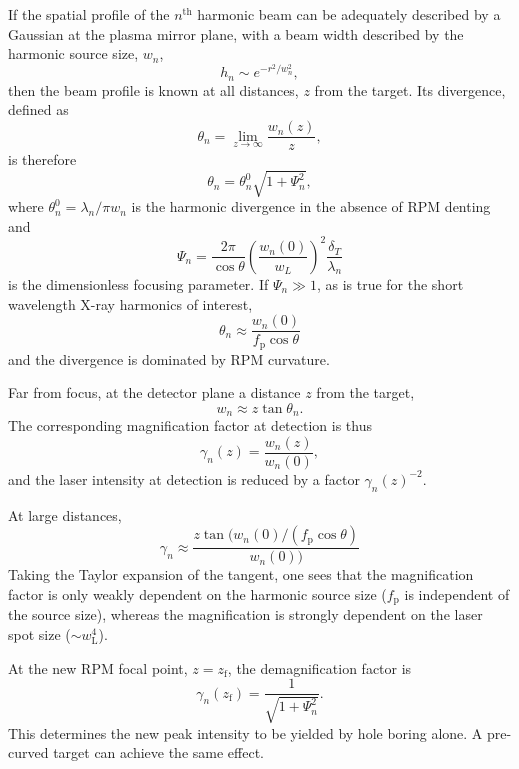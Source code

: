 If the spatial profile of the $n^\mathrm{th}$ harmonic beam can be adequately described by a Gaussian at the plasma mirror plane, with a beam width described by the harmonic source size, $w_n$,
\begin{equation}
	h_n \sim e^{-r^2/w_n^2},
\end{equation}
then the beam profile is known at all distances, $z$ from the target. Its divergence, defined as 
\begin{equation}
	\theta_n = \lim_{z\to\infty} \frac{w_n(z)}{z},
\end{equation}
is therefore
\begin{equation}
	\theta_n = \theta^0_n\sqrt{1+\Psi^2_n},
\end{equation}
where $\theta^0_n = \lambda_n/\pi w_n$ is the harmonic divergence in the absence of RPM denting and
\begin{equation}
	\Psi_n = \frac{2\pi}{\cos\theta}\left(\frac{w_n(0)}{w_L}\right)^2\frac{\delta_T}{\lambda_n}
\end{equation}
is the dimensionless focusing parameter. If $\Psi_n \gg 1$, as is true for the short wavelength X-ray harmonics of interest, 
\begin{equation}
	\theta_n \approx \frac{w_n(0)}{f_\mathrm{p}\cos\theta}
\end{equation}
and the divergence is dominated by RPM curvature. 

Far from focus, at the detector plane a distance $z$ from the target,
\begin{equation}
	w_{n} \approx z\tan\theta_n.
\end{equation}
The corresponding magnification factor at detection is thus 
\begin{equation}
	\gamma_n(z) = \frac{w_n(z)}{w_n(0)},
\end{equation}
and the laser intensity at detection is reduced by a factor $\gamma_n(z)^{-2}$.

At large distances,
\begin{equation}
	\gamma_n \approx \frac{z\tan(w_n(0)/(f_\mathrm{p}\cos\theta)}{w_n(0))}
\end{equation}
Taking the Taylor expansion of the tangent, one sees that the magnification factor is only weakly dependent on the harmonic source size ($f_\mathrm{p}$ is independent of the source size), whereas the magnification is strongly dependent on the laser spot size ($\sim w_\mathrm{L}^4$).

At the new \ac{RPM} focal point, $z = z_\mathrm{f}$, the demagnification factor is \cite{vincentiOpticalPropertiesRelativistic2014}
\begin{equation}\label{eq:orion-magnification}
	\gamma_n(z_\mathrm{f}) = \frac{1}{\sqrt{1+\Psi_n^2}}.
\end{equation}
This determines the new peak intensity to be yielded by hole boring alone. A pre-curved target can achieve the same effect.

